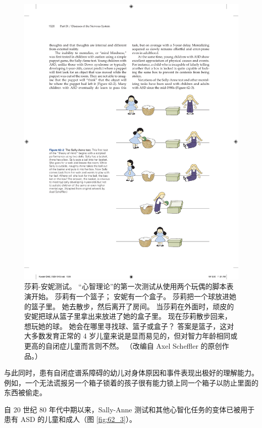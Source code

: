 \begin{figure}[htbp]
	\centering
	\includegraphics[width=0.65\linewidth]{chap62/fig_62_2}
	\caption{莎莉-安妮测试。 “心智理论”的第一次测试从使用两个玩偶的脚本表演开始。 莎莉有一个篮子； 安妮有一个盒子。 莎莉把一个球放进她的篮子里。 她去散步，然后离开了房间。 当莎莉在外面时，顽皮的安妮把球从篮子里拿出来放进了她的盒子里。 现在莎莉散步回来，想玩她的球。 她会在哪里寻找球、篮子或盒子？ 答案是篮子，这对大多数发育正常的 4 岁儿童来说是显而易见的，但对智力年龄相同或更高的自闭症儿童而言则不然。 （改编自 Axel Scheffler 的原创作品。）}
	\label{fig:62_2}
\end{figure}

与此同时，患有自闭症谱系障碍的幼儿对身体原因和事件表现出极好的理解能力。 例如，一个无法谎报另一个箱子锁着的孩子很有能力锁上同一个箱子以防止里面的东西被偷走。

自 20 世纪 80 年代中期以来，Sally-Anne 测试和其他心智化任务的变体已被用于患有 ASD 的儿童和成人（图 \ref{fig:62_3}）。

